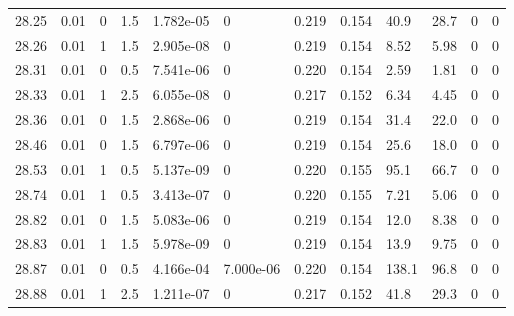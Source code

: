 \documentclass[preview]{standalone}
\begin{document}
{{{{{{{{{{{{{\begin{tabular}{L{1.2cm}C{1.2cm} C{0.3cm}C{0.5cm} C{1.4cm}C{1.4cm} C{1.4cm}C{1.4cm} C{1.6cm}C{1.6cm} C{1.6cm}C{1.6cm}}
  28.25  &  0.01  & 0     & 1.5 &  1.782e-05  & 0  &  0.219&   0.154& 40.9 & 28.7   &  0 & 0  \\ 
  28.26  &  0.01  & 1     & 1.5 &  2.905e-08  & 0  &  0.219&   0.154& 8.52 & 5.98   &  0 & 0  \\ 
  28.31  &  0.01  & 0     & 0.5 &  7.541e-06  & 0  &  0.220&   0.154& 2.59 & 1.81   &  0 & 0  \\ 
  28.33  &  0.01  & 1     & 2.5 &  6.055e-08  & 0  &  0.217&   0.152& 6.34 & 4.45   &  0 & 0  \\ 
  28.36  &  0.01  & 0     & 1.5 &  2.868e-06  & 0  &  0.219&   0.154& 31.4 & 22.0   &  0 & 0  \\ 
  28.46  &  0.01  & 0     & 1.5 &  6.797e-06  & 0  &  0.219&   0.154& 25.6 & 18.0   &  0 & 0  \\ 
  28.53  &  0.01  & 1     & 0.5 &  5.137e-09  & 0  &  0.220&   0.155& 95.1 & 66.7   &  0 & 0  \\ 
  28.74  &  0.01  & 1     & 0.5 &  3.413e-07  & 0  &  0.220&   0.155& 7.21 & 5.06   &  0 & 0  \\ 
  28.82  &  0.01  & 0     & 1.5 &  5.083e-06  & 0  &  0.219&   0.154& 12.0 & 8.38   &  0 & 0  \\ 
  28.83  &  0.01  & 1     & 1.5 &  5.978e-09  & 0  &  0.219&   0.154& 13.9 & 9.75   &  0 & 0  \\ 
  28.87  &  0.01  & 0     & 0.5 &  4.166e-04  & 7.000e-06  &  0.220&   0.154& 138.1 & 96.8   &  0 & 0  \\ 
  28.88  &  0.01  & 1     & 2.5 &  1.211e-07  & 0  &  0.217&   0.152& 41.8 & 29.3   &  0 & 0  \\ 
\hline 
\end{tabular} 

}}}}}}}}}}}}}
\end{document}
